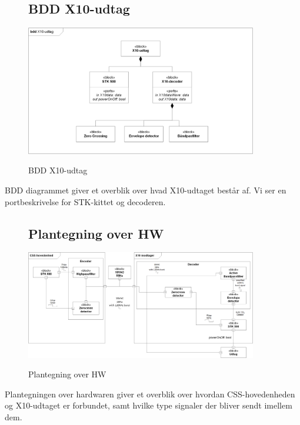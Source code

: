 \begin{figure}[!htbp] \centering
\subsection{BDD X10-udtag}
{\includegraphics[width=0.9\textwidth]{billeder/diagrammer/BDD_Modtager}}
\caption{BDD X10-udtag}
\label{lab:bddmodtager}
\raggedright
\end{figure}
BDD diagrammet giver et overblik over hvad X10-udtaget består af. Vi ser en portbeskrivelse for STK-kittet og decoderen.

\begin{figure}[!htbp] \centering
\subsection{Plantegning over HW}
{\includegraphics[width=0.9\textwidth]{billeder/diagrammer/Plantegning_over_HW}}
\caption{Plantegning over HW}
\label{lab:Plantegning over HW}
\raggedright
\end{figure}
Plantegningen over hardwaren giver et overblik over hvordan CSS-hovedenheden og X10-udtaget er forbundet, samt hvilke type signaler der bliver sendt imellem dem.

